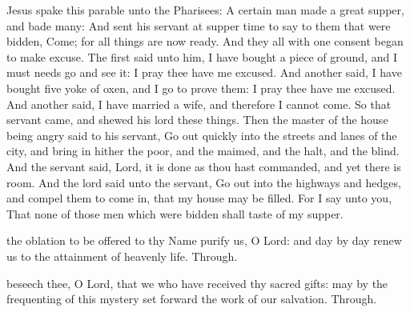 
 Jesus spake this parable unto the Pharisees: A certain man made a great supper, and bade many: And sent his servant at supper time to say to them that were bidden, Come; for all things are now ready. And they all with one consent began to make excuse. The first said unto him, I have bought a piece of ground, and I must needs go and see it: I pray thee have me excused. And another said, I have bought five yoke of oxen, and I go to prove them: I pray thee have me excused. And another said, I have married a wife, and therefore I cannot come. So that servant came, and shewed his lord these things. Then the master of the house being angry said to his servant, Go out quickly into the streets and lanes of the city, and bring in hither the poor, and the maimed, and the halt, and the blind. And the servant said, Lord, it is done as thou hast commanded, and yet there is room. And the lord said unto the servant, Go out into the highways and hedges, and compel them to come in, that my house may be filled. For I say unto you, That none of those men which were bidden shall taste of my supper.


\secret
{} the oblation to be offered to thy Name purify us, O Lord: and day by day renew us to the attainment of heavenly life. Through.



\postcommunion
{} beseech thee, O Lord, that we who have received thy sacred gifts: may by the frequenting of this mystery set forward the work of our salvation. Through.


\clearpage
{}\label{TrinityIII}


